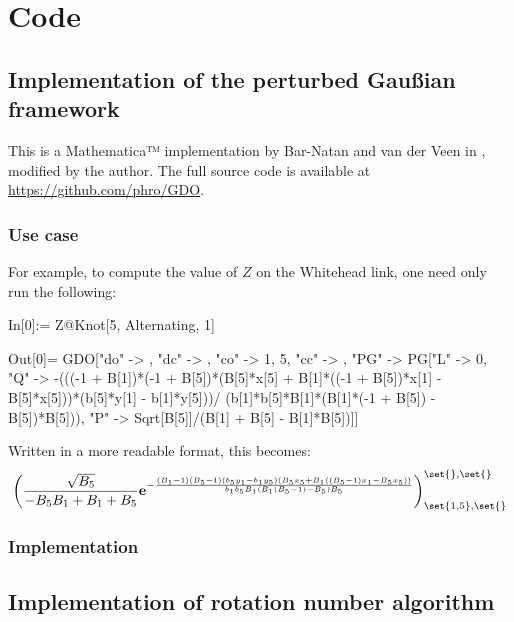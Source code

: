 \chapter{Code}
\section{Implementation of the perturbed Gaußian framework}
This is a Mathematica™ implementation by Bar-Natan and van der Veen in
\cite{BV}, modified by the author. The full source code is available at
\url{https://github.com/phro/GDO}.

\subsection{Use case}
For example, to compute the value of $Z$ on the Whitehead link, one need only
run the following:

\begin{mathematica}
In[0]:= Z@Knot[5, Alternating, 1]
\end{mathematica}
\begin{mathematica}
Out[0]= GDO["do" -> {}, "dc" -> {}, "co" -> {1, 5}, "cc" -> {}, "PG" -> PG["L" -> 0, "Q" -> -(((-1 + B[1])*(-1 + B[5])*(B[5]*x[5] + B[1]*((-1 + B[5])*x[1] - B[5]*x[5]))*(b[5]*y[1] - b[1]*y[5]))/ (b[1]*b[5]*B[1]*(B[1]*(-1 + B[5]) - B[5])*B[5])), "P" -> Sqrt[B[5]]/(B[1] + B[5] - B[1]*B[5])]]
\end{mathematica}
Written in a more readable format, this becomes:
\begin{equation}
\left(
        \frac{\sqrt{B_5}}{-B_5 B_1+B_1+B_5}
        \Exp{
                -\frac{
                        \left(B_1-1\right) \left(B_5-1\right)
                        \left(b_5 y_1-b_1 y_5\right)
                        \left(
                                B_5 x_5+
                                B_1 \left((B_5-1) x_1 - B_5 x_5\right)
                        \right)
                }{
                        b_1 b_5 B_1 \left(B_1 \left(B_5-1\right)-B_5\right) B_5
                }
        }
\right)_{\set{1,5},\set{}}^{\set{},\set{}} 
\end{equation}

\subsection{Implementation}



\section{Implementation of rotation number algorithm}

